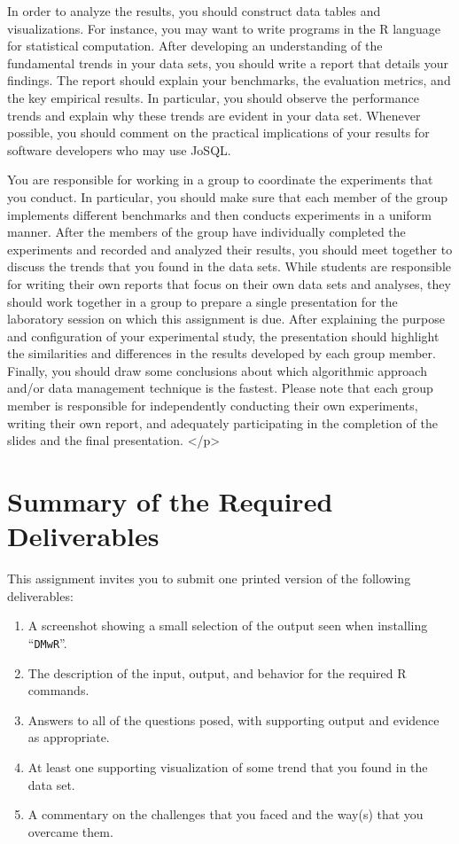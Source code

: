In order to analyze the results, you should construct data tables and visualizations.  For instance, you may want to
write programs in the R language for statistical computation.  After developing an understanding of the fundamental
trends in your data sets, you should write a report that details your findings.  The report should explain your
benchmarks, the evaluation metrics, and the key empirical results.  In particular, you should observe the performance
trends and explain why these trends are evident in your data set.  Whenever possible, you should comment on the
practical implications of your results for software developers who may use JoSQL.  

You are responsible for working in a group to coordinate the experiments that you conduct.  In particular, you should
make sure that each member of the group implements different benchmarks and then conducts experiments in a uniform
manner.  After the members of the group have individually completed the experiments and recorded and analyzed their
results, you should meet together to discuss the trends that you found in the data sets.  While students are responsible
for writing their own reports that focus on their own data sets and analyses, they should work together in a group to
prepare a single presentation for the laboratory session on which this assignment is due.  After explaining the purpose
and configuration of your experimental study, the presentation should highlight the similarities and differences in the
results developed by each group member.  Finally, you should draw some conclusions about which algorithmic approach
and/or data management technique is the fastest.  Please note that each group member is responsible for independently
conducting their own experiments, writing their own report, and adequately participating in the completion of the slides
and the final presentation.  </p>


\section*{Summary of the Required Deliverables}

  This assignment invites you to submit one printed version of the following deliverables:

  \vspace*{-.05in}
  \begin{enumerate}
    \setlength{\itemsep}{0pt}
    \item A screenshot showing a small selection of the output seen when installing ``{\tt DMwR}''.
    \item The description of the input, output, and behavior for the required R commands.
    \item Answers to all of the questions posed, with supporting output and evidence as appropriate. 
    \item At least one supporting visualization of some trend that you found in the data set. 
    \item A commentary on the challenges that you faced and the way(s) that you overcame them.
  \end{enumerate}

